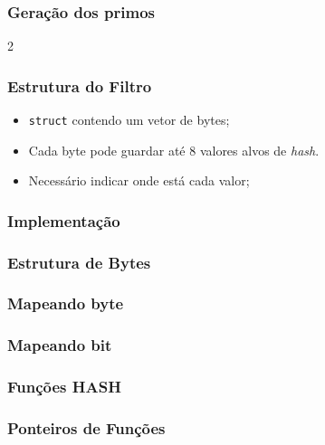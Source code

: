 \documentclass[t, handout, xcolor=table, aspectratio=169]{beamer}
\begin{document}
\begin{frame}
  \frametitle{Geração dos primos}
  \begin{multicols}{2}
    
  \end{multicols}
\end{frame}



\begin{frame}
  \frametitle{Estrutura do Filtro}

  \begin{itemize}
    \item \texttt{struct} contendo um vetor de bytes;
    \item Cada byte pode guardar até 8 valores alvos de \emph{hash}.
    \item Necessário indicar onde está cada valor;
  \end{itemize}

\end{frame}
\begin{frame}
  \frametitle{Implementação}
  
\end{frame}

\begin{frame}
  \frametitle{Estrutura de Bytes}

  

\end{frame}

\begin{frame}
  \frametitle{Mapeando byte}

\end{frame}

\begin{frame}
  \frametitle{Mapeando bit}

\end{frame}

\begin{frame}
  \frametitle{Funções HASH}


\end{frame}

\begin{frame}
  \frametitle{Ponteiros de Funções}



\end{frame}
\end{document}
